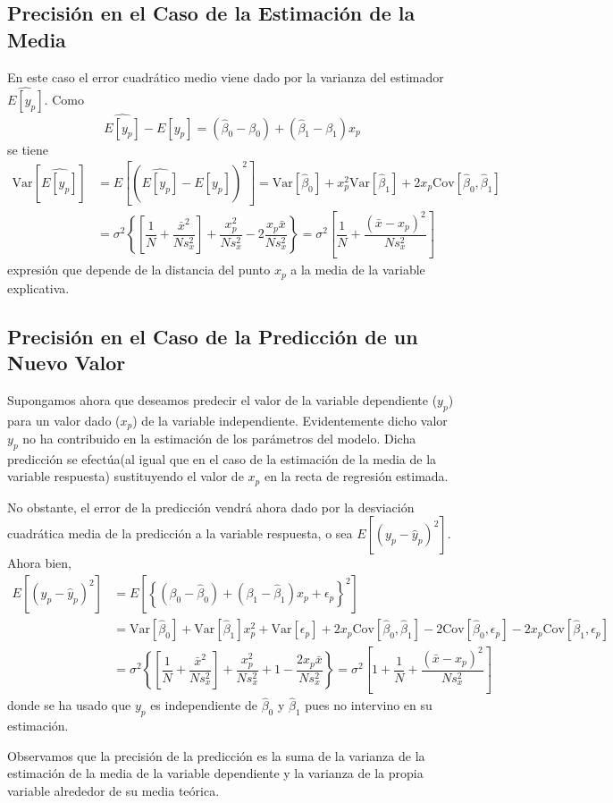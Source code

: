 \documentclass[10pt,a4paper]{book}
\begin{document}
		\subsection*{Precisión en el Caso de la Estimación de la Media}
En este caso el error cuadrático medio viene dado por la varianza del estimador $\widehat{E[y_p]}$. Como $$\widehat{E[y_p]}-E[y_p]=(\widehat{\beta}_0-\beta_0)+(\widehat{\beta}_1-\beta_1)x_p$$ se tiene
\begin{equation*}
\begin{split}
\mathrm{Var}[\widehat{E[y_p]}]&=E[(\widehat{E[y_p]}-E[y_p])^2]=\mathrm{Var}[\widehat{\beta}_0]+x^2_p\mathrm{Var}[\widehat{\beta}_1]+2x_p\mathrm{Cov}[\widehat{\beta}_0,\widehat{\beta}_1]\\
&=\sigma^2\left\lbrace\left[\dfrac{1}{N}+\dfrac{\bar{x}^2}{Ns^2_x}\right]+\dfrac{x^2_p}{Ns^2_x}-2\dfrac{x_p\bar{x}}{Ns^2_x}\right\rbrace=\sigma^2\left[\dfrac{1}{N}+\dfrac{(\bar{x}-x_p)^2}{Ns^2_x}\right]
\end{split}
\end{equation*}
expresión que depende de la distancia del punto $x_p$ a la media de la variable explicativa.
		\subsection*{Precisión en el Caso de la Predicción de un Nuevo Valor}
Supongamos ahora que deseamos predecir el valor de la variable dependiente ($y_p$) para un valor dado ($x_p$) de la variable independiente. Evidentemente dicho valor $y_p$ no ha contribuido en la estimación de los parámetros del modelo. Dicha predicción se efectúa(al igual que en el caso de la estimación de la media de la variable respuesta) sustituyendo el valor de $x_p$ en la recta de regresión estimada.

No obstante, el error de la predicción vendrá ahora dado por la desviación cuadrática media de la predicción a la variable respuesta, o sea $E[(y_p-\widehat{y}_p)^2]$. Ahora bien,
\begin{equation*}
\begin{split}
E[(y_p-\widehat{y}_p)^2]&=E\left[\left\lbrace(\beta_0-\widehat{\beta}_0)+(\beta_1-\widehat{\beta}_1)x_p+\epsilon_p\right\rbrace^2\right]\\
&=\mathrm{Var}[\widehat{\beta}_0]+\mathrm{Var}[\widehat{\beta}_1]x^2_p+\mathrm{Var}[\epsilon_p]+2x_p\mathrm{Cov}[\widehat{\beta}_0,\widehat{\beta}_1]-2\mathrm{Cov}[\widehat{\beta}_0,\epsilon_p]-2x_p\mathrm{Cov}[\widehat{\beta}_1,\epsilon_p]\\
&=\sigma^2\left\lbrace\left[\dfrac{1}{N}+\dfrac{\bar{x}^2}{Ns^2_x}\right]+\dfrac{x^2_p}{Ns^2_x}+1-\dfrac{2x_p\bar{x}}{Ns^2_x}\right\rbrace=\sigma^2\left[1+\dfrac{1}{N}+\dfrac{(\bar{x}-x_p)^2}{Ns^2_x}\right]
\end{split}
\end{equation*}
donde se ha usado que $y_p$ es independiente de $\widehat{\beta}_0$ y $\widehat{\beta}_1$ pues no intervino en su estimación.

Observamos que la precisión de la predicción es la suma de la varianza de la estimación de la media de la variable dependiente y la varianza de la propia variable alrededor de su media teórica.
\end{document}
